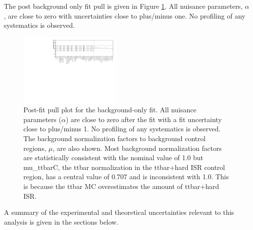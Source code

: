 

%


\indent The post background only fit pull is given in Figure \ref{figure.pullPlot}.  All nuisance parameters, $\alpha$, are close to zero with uncertainties close to plus/minus one.  No profiling of any systematics is observed. \\

\begin{figure}[h!]
	\begin{center}
		\includegraphics[width=0.45\textwidth, angle=180]{HistFitterStuff/pullPlot.pdf}
		\caption[Post-fit pull plot for the background-only fit]{Post-fit pull plot for the background-only fit.  All nuisance parameters ($\alpha$) are close to zero after the fit with a fit uncertainty close to plus/minus 1.  No profiling of any systematics is observed.  The background normalization factors to background control regions, $\mu$, are also shown.  Most background normalization factors are statistically consistent with the nominal value of 1.0 but mu\_ttbarC, the ttbar normalization in the ttbar+hard ISR control region, has a central value of 0.707 and is inconsistent with 1.0.  This is because the ttbar MC overestimates the amount of ttbar+hard ISR.   }
		\label{figure.pullPlot}
	\end{center}
\end{figure}

\indent A summary of the experimental and theoretical uncertainties relevant to this analysis is given in the sections below. \\



